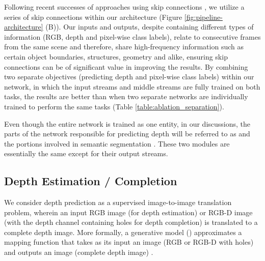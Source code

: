 \documentclass[10pt,twocolumn,letterpaper]{article}
\begin{document}
Following recent successes of approaches using skip connections \cite{orhan2017skip, ronneberger2015u, tong2017image, yamanaka2017fast}, we utilize a series of skip connections within our architecture (Figure \ref{fig:pipeline-architecture} (B)). Our inputs and outputs, despite containing different types of information (RGB, depth and pixel-wise class labels), relate to consecutive frames from the same scene and therefore, share high-frequency information such as certain object boundaries, structures, geometry and alike, ensuring skip connections can be of significant value in improving the results. By combining two separate objectives (predicting depth and pixel-wise class labels) within our network, in which the input streams and middle streams are fully trained on both tasks, the results are better than when two separate networks are individually trained to perform the same tasks (Table \ref{table:ablation_separation}).

Even though the entire network is trained as one entity, in our discussions, the parts of the network responsible for predicting depth will be referred to as  and the portions involved in semantic segmentation . These two modules are essentially the same except for their output streams.\vspace{-0.1cm}

\subsection{Depth Estimation / Completion}
\label{ssec:depth_approach}\vspace{-0.1cm}

We consider depth prediction as a supervised image-to-image translation problem, wherein an input RGB image (for depth estimation) or RGB-D image (with the depth channel containing holes for depth completion) is translated to a complete depth image. More formally, a generative model () approximates a mapping function that takes as its input an image  (RGB or RGB-D with holes) and outputs an image  (complete depth image) .
\end{document}
